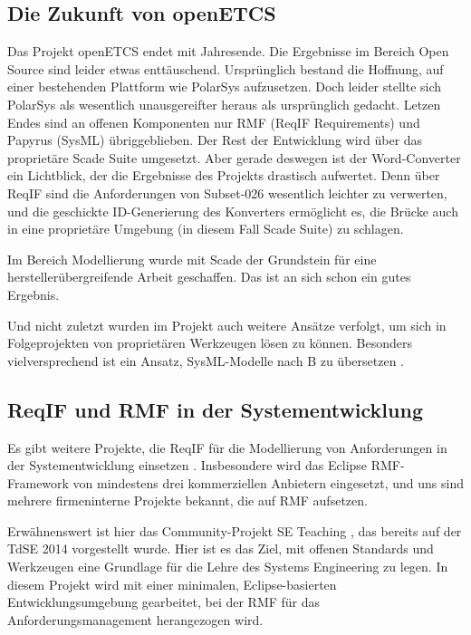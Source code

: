 \documentclass[twoside]{article}
\begin{document}
\begin{multicols}{2}
\section{Die Zukunft von openETCS}

Das Projekt openETCS endet mit Jahresende.  Die Ergebnisse im Bereich Open Source sind leider etwas enttäuschend.  Ursprünglich bestand die Hoffnung, auf einer bestehenden Plattform wie PolarSys aufzusetzen.  Doch leider stellte sich PolarSys als wesentlich unausgereifter heraus als ursprünglich gedacht.  Letzen Endes sind an offenen Komponenten nur RMF (ReqIF Requirements) und Papyrus (SysML) übriggeblieben.  Der Rest der Entwicklung wird über das proprietäre Scade Suite umgesetzt.  Aber gerade deswegen ist der Word-Converter ein Lichtblick, der die Ergebnisse des Projekts drastisch aufwertet. Denn über ReqIF sind die Anforderungen von Subset-026 wesentlich leichter zu verwerten, und die geschickte ID-Generierung des Konverters ermöglicht es, die Brücke auch in eine proprietäre Umgebung (in diesem Fall Scade Suite) zu schlagen.

Im Bereich Modellierung wurde mit Scade der Grundstein für eine herstellerübergreifende Arbeit geschaffen.  Das ist an sich schon ein gutes Ergebnis.  

Und nicht zuletzt wurden im Projekt auch weitere Ansätze verfolgt, um sich in Folgeprojekten von proprietären Werkzeugen lösen zu können.  Besonders vielversprechend ist ein Ansatz, SysML-Modelle nach B zu übersetzen \cite{sysml2b}. 

\subsection{ReqIF und RMF in der Systementwicklung}

Es gibt weitere Projekte, die ReqIF für die Modellierung von Anforderungen in der Systementwicklung einsetzen \cite{reqifolution,ix,eclipse-teaching}.  Insbesondere wird das Eclipse RMF-Framework von mindestens drei kommerziellen Anbietern eingesetzt, und uns sind mehrere firmeninterne Projekte bekannt, die auf RMF aufsetzen.

Erwähnenswert ist hier das Community-Projekt SE Teaching \cite{se-teaching}, das bereits auf der TdSE 2014 vorgestellt wurde.  Hier ist es das Ziel, mit offenen Standards und Werkzeugen eine Grundlage für die Lehre des Systems Engineering zu legen.  In diesem Projekt wird mit einer minimalen, Eclipse-basierten Entwicklungsumgebung gearbeitet, bei der RMF für das Anforderungsmanagement herangezogen wird.


\end{multicols}
\end{document}
